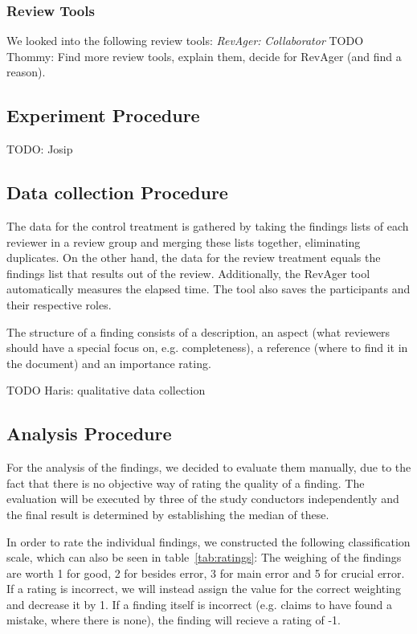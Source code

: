 \subsubsection{Review Tools}

We looked into the following review tools:
\textit{RevAger:}
\textit{Collaborator}
TODO Thommy: Find more review tools, explain them, decide for RevAger (and find a reason).

\subsection{Experiment Procedure}
TODO: Josip

\subsection{Data collection Procedure}

The data for the control treatment is gathered by taking the findings lists of each reviewer in a review group and merging these lists together, eliminating duplicates.
On the other hand, the data for the review treatment equals the findings list that results out of the review. Additionally, the RevAger tool automatically measures the elapsed time.
The tool also saves the participants and their respective roles.

The structure of a finding consists of a description, an aspect (what reviewers should have a special focus on, e.g. completeness), a reference (where to find it in the document) and an importance rating.

TODO Haris: qualitative data collection


\subsection{Analysis Procedure}

For the analysis of the findings, we decided to evaluate them manually, due to the fact that there is no objective way of rating the quality of a finding. The evaluation will be executed by three of the study conductors independently and the final result is determined by establishing the median of these.

In order to rate the individual findings, we constructed the following classification scale, which can also be seen in table~\ref{tab:ratings}:
The weighing of the findings are worth 1 for good, 2 for besides error, 3 for main error and 5 for crucial error. If a rating is incorrect, we will instead assign the value for the correct weighting and decrease it by 1.
If a finding itself is incorrect (e.g. claims to have found a mistake, where there is none), the finding will recieve a rating of -1.

